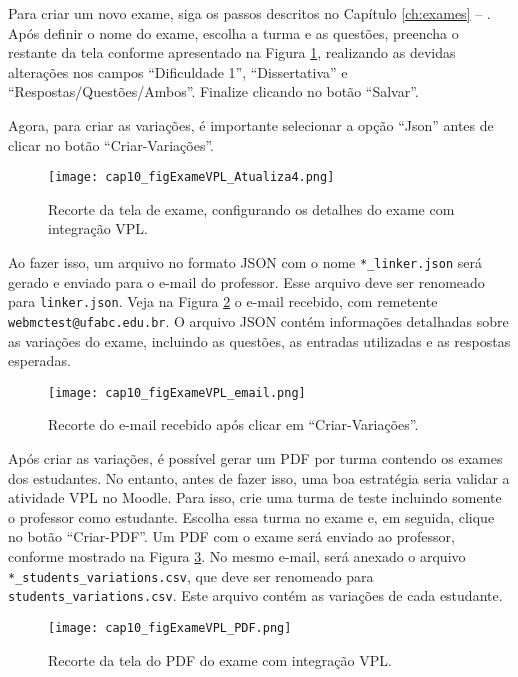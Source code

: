 Para criar um novo exame, siga os passos descritos no Capítulo \ref{ch:exames} -- . Após definir o nome do exame, escolha a turma e as questões, preencha o restante da tela conforme apresentado na Figura \ref{fig:cap10_figExameVPL_Atualiza4}, realizando as devidas alterações nos campos  ``Dificuldade 1'', ``Dissertativa'' e ``Respostas/Questões/Ambos''. Finalize clicando no botão ``Salvar''.

Agora, para criar as variações, é importante selecionar a opção ``Json'' antes de clicar no botão ``Criar-Variações''.

\begin{figure}[htbp]
  \centering
  \texttt{[image: cap10\_figExameVPL\_Atualiza4.png]}
  \caption{Recorte da tela de exame, configurando os detalhes do exame com integração VPL.}
  \label{fig:cap10_figExameVPL_Atualiza4}
\end{figure}

Ao fazer isso, um arquivo no formato JSON com o nome \verb|*_linker.json| será gerado e enviado para o e-mail do professor. Esse arquivo deve ser renomeado para \verb|linker.json|. Veja na Figura \ref{fig:cap10_figExameVPL_email} o e-mail recebido, com remetente \verb|webmctest@ufabc.edu.br|. O arquivo JSON contém informações detalhadas sobre as variações do exame, incluindo as questões, as entradas utilizadas e as respostas esperadas.

\begin{figure}[htbp]
  \centering
  \texttt{[image: cap10\_figExameVPL\_email.png]}
   \caption{Recorte do e-mail recebido após clicar em ``Criar-Variações''.}
  \label{fig:cap10_figExameVPL_email}
\end{figure}

Após criar as variações, é possível gerar um PDF por turma contendo os exames dos estudantes. No entanto, antes de fazer isso, uma boa estratégia seria validar a atividade VPL no Moodle. Para isso, crie uma turma de teste incluindo somente o professor como estudante. Escolha essa turma no exame e, em seguida, clique no botão ``Criar-PDF''. Um PDF com o exame será enviado ao professor, conforme mostrado na Figura \ref{fig:cap10_figExameVPL_PDF}.
No mesmo e-mail, será anexado o arquivo \verb|*_students_variations.csv|, que deve ser renomeado para \verb|students_variations.csv|. Este arquivo contém as variações de cada estudante.

\begin{figure}[htbp]
  \centering
  \texttt{[image: cap10\_figExameVPL\_PDF.png]}
  \caption{Recorte da tela do PDF do exame com integração VPL.}
  \label{fig:cap10_figExameVPL_PDF}
\end{figure}

